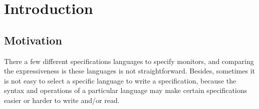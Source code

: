\section{Introduction}

\subsection{Motivation}
There a few different specifications languages to specify monitors, and comparing the expressiveness is these languages is not straightforward. Besides, sometimes it is not easy to select a specific language to write a specification, because the syntax and operations of a particular language may make certain specifications easier or harder to write and/or read. 